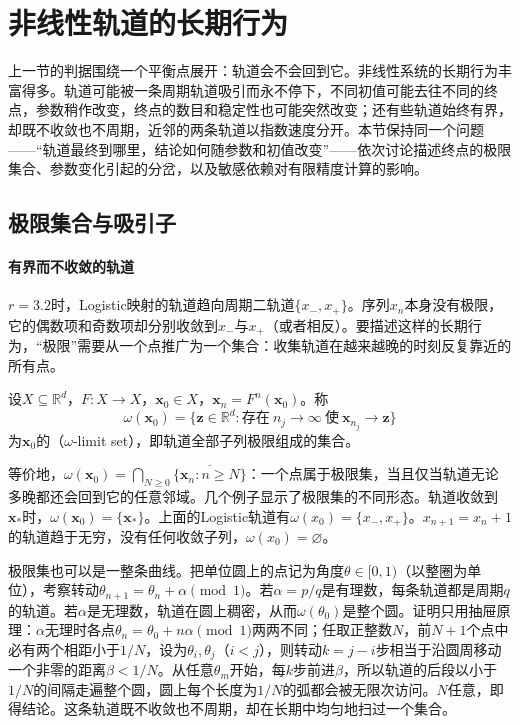 
\section{非线性轨道的长期行为}
\label{sec:dds-nonlinear-long-term}

上一节的判据围绕一个平衡点展开：轨道会不会回到它。非线性系统的长期行为丰富得多。轨道可能被一条周期轨道吸引而永不停下，不同初值可能去往不同的终点，参数稍作改变，终点的数目和稳定性也可能突然改变；还有些轨道始终有界，却既不收敛也不周期，近邻的两条轨道以指数速度分开。本节保持同一个问题——“轨道最终到哪里，结论如何随参数和初值改变”——依次讨论描述终点的极限集合、参数变化引起的分岔，以及敏感依赖对有限精度计算的影响。

\subsection{极限集合与吸引子}
\label{sec:dds-limit-sets}

\paragraph{有界而不收敛的轨道}
$r=3.2$时，Logistic映射的轨道趋向周期二轨道$\{x_-,x_+\}$。序列$x_n$本身没有极限，它的偶数项和奇数项却分别收敛到$x_-$与$x_+$（或者相反）。要描述这样的长期行为，“极限”需要从一个点推广为一个集合：收集轨道在越来越晚的时刻反复靠近的所有点。

\begin{definition}
\label{def:dds-omega-limit}
设$X\subseteq\mathbb R^d$，$F:X\to X$，$\bm x_0\in X$，$\bm x_n=F^n(\bm x_0)$。称
\[
  \omega(\bm x_0)=\bigl\{\bm z\in\mathbb R^d:\text{存在}\ n_j\to\infty\ \text{使}\ \bm x_{n_j}\to\bm z\bigr\}
\]
为$\bm x_0$的（$\omega$-limit set），即轨道全部子列极限组成的集合。
\end{definition}

等价地，$\omega(\bm x_0)=\bigcap_{N\geq0}\overline{\{\bm x_n:n\geq N\}}$：一个点属于极限集，当且仅当轨道无论多晚都还会回到它的任意邻域。几个例子显示了极限集的不同形态。轨道收敛到$\bm x_*$时，$\omega(\bm x_0)=\{\bm x_*\}$。上面的Logistic轨道有$\omega(x_0)=\{x_-,x_+\}$。$x_{n+1}=x_n+1$的轨道趋于无穷，没有任何收敛子列，$\omega(x_0)=\varnothing$。

极限集也可以是一整条曲线。把单位圆上的点记为角度$\theta\in[0,1)$（以整圈为单位），考察转动$\theta_{n+1}=\theta_n+\alpha\pmod1$。若$\alpha=p/q$是有理数，每条轨道都是周期$q$的轨道。若$\alpha$是无理数，轨道在圆上稠密，从而$\omega(\theta_0)$是整个圆。证明只用抽屉原理：$\alpha$无理时各点$\theta_n=\theta_0+n\alpha\pmod1$两两不同；任取正整数$N$，前$N+1$个点中必有两个相距小于$1/N$，设为$\theta_i,\theta_j$（$i<j$），则转动$k=j-i$步相当于沿圆周移动一个非零的距离$\beta<1/N$。从任意$\theta_m$开始，每$k$步前进$\beta$，所以轨道的后段以小于$1/N$的间隔走遍整个圆，圆上每个长度为$1/N$的弧都会被无限次访问。$N$任意，即得结论。这条轨道既不收敛也不周期，却在长期中均匀地扫过一个集合。

